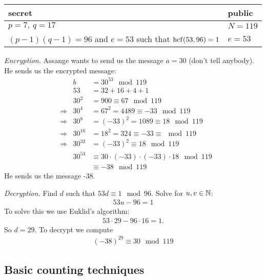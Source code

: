 \begin{ex} \mbox \\
	\begin{center}
		\begin{tabularx}{.5\textwidth}{XX}
			\toprule
			secret & public \\
			\toprule
			$p=7,~ q = 17$ & $N = 119$ \\
			\midrule
			$(p-1)(q-1) = 96$ and $e=53$ such that $\operatorname{hcf}(53,96) = 1$ & $e=53$ \\
			\bottomrule
		\end{tabularx}
	\end{center}
	\emph{Encryption.}
	Assange wants to send us the message $a=30$ (don't tell anybody).
	He sends us the encrypted message:
	\begin{align*}
	& & b & = 30^{53} \mod 119 \\
	& & 53 & = 32+16+4+1 \\
	& & 30^2 & = 900 \equiv 67 \mod 119 \\
	& \Rightarrow & 30^4 & = 67^2 = 4489 \equiv -33 \mod 119 \\ 
	& \Rightarrow & 30^8 & = (-33)^2 = 1089 \equiv 18 \mod 119 \\
	& \Rightarrow & 30^{16} & = 18^2 = 324 \equiv -33 \equiv \mod 119 \\
	& \Rightarrow & 30^{32} & = (-33)^2 \equiv 18 \mod 119 \\
	& & 30^{53} & \equiv 30 \cdot (-33) \cdot (-33) \cdot 18 \mod 119 \\
	& & & \equiv  -38 \mod 119
	\end{align*}
	He sends us the message -38.
	
	\emph{Decryption.}
	Find $d$ such that $53d \equiv 1 \mod 96$. Solve for $u,v \in \mathbb N$:
	\begin{align*}
	53 u - 96 = 1 
	\end{align*}
	To solve this we use Euklid's algorithm:
	\begin{align*}
	53 \cdot 29 - 96 \cdot 16 = 1.
	\end{align*}
	So $d = 29$. To decrypt we compute 
	\begin{align*}
	(-38)^{29} \equiv 30 \mod 119 
	\end{align*}
\end{ex}

\subsection{Basic counting techniques}


